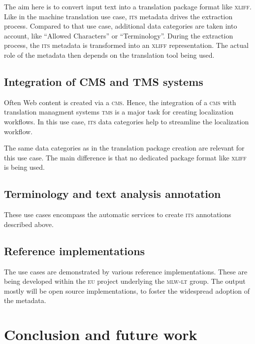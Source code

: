 \documentclass[output=paper]{LSP/langsci}
\begin{document}
The aim here is to convert input text into a translation package format like \textsc{xliff}. Like in the machine translation use case, \textsc{its } metadata drives the extraction process. Compared to that use case, additional data categories are taken into account, like ``Allowed Characters'' or ``Terminology''. During the extraction process, the \textsc{its } metadata is transformed into an \textsc{xliff} representation. The actual role of the metadata then depends on the translation tool being used.

\subsection{Integration of CMS and TMS systems}\label{sec:sasaki:5.3}

Often Web content is created via a \textsc{cms}. Hence, the integration of a \textsc{cms} with translation managment systems \textsc{tms} is a major task for creating localization workflows. In this use case, \textsc{its } data categories help to streamline the localization workflow.

The same data categories as in the translation package creation are relevant for this use case. The main difference is that no dedicated package format like \textsc{xliff} is being used.

\subsection{Terminology and text analysis annotation}\label{sec:sasaki:5.4}

These use cases encompass the automatic services to create \textsc{its } annotations described above. 

\subsection{Reference implementations}\label{sec:sasaki:5.5}

The use cases are demonstrated by various reference implementations. These are being developed within the \textsc{eu} project underlying the \textsc{mlw-lt} group. The output mostly will be open source implementations, to foster the widespread adoption of the metadata.

\section{Conclusion and future work}\label{sec:sasaki:6}
\end{document}
